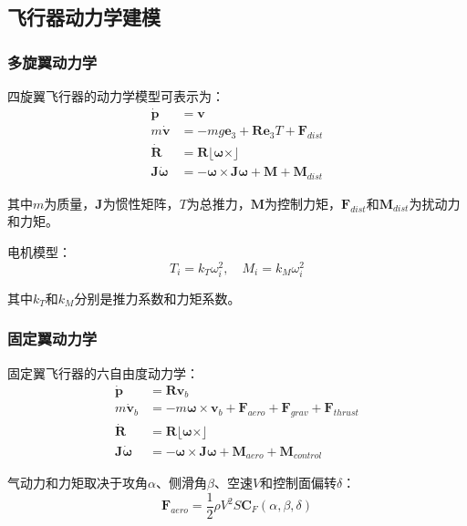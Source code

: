 \documentclass[12pt,a4paper]{ctexart}
\begin{document}
\subsection{飞行器动力学建模}

\subsubsection{多旋翼动力学}

四旋翼飞行器的动力学模型可表示为：
\begin{align}
    \dot{\mathbf{p}} &= \mathbf{v} \\
    m\dot{\mathbf{v}} &= -mg\mathbf{e}_3 + \mathbf{R}\mathbf{e}_3 T + \mathbf{F}_{dist} \\
    \dot{\mathbf{R}} &= \mathbf{R}\lfloor\boldsymbol{\omega}\times\rfloor \\
    \mathbf{J}\dot{\boldsymbol{\omega}} &= -\boldsymbol{\omega} \times \mathbf{J}\boldsymbol{\omega} + \mathbf{M} + \mathbf{M}_{dist}
\end{align}

其中$m$为质量，$\mathbf{J}$为惯性矩阵，$T$为总推力，$\mathbf{M}$为控制力矩，$\mathbf{F}_{dist}$和$\mathbf{M}_{dist}$为扰动力和力矩。

电机模型：
\begin{equation}
    T_i = k_T \omega_i^2, \quad M_i = k_M \omega_i^2
\end{equation}

其中$k_T$和$k_M$分别是推力系数和力矩系数。

\subsubsection{固定翼动力学}

固定翼飞行器的六自由度动力学：
\begin{align}
    \dot{\mathbf{p}} &= \mathbf{R}\mathbf{v}_b \\
    m\dot{\mathbf{v}}_b &= -m\boldsymbol{\omega} \times \mathbf{v}_b + \mathbf{F}_{aero} + \mathbf{F}_{grav} + \mathbf{F}_{thrust} \\
    \dot{\mathbf{R}} &= \mathbf{R}\lfloor\boldsymbol{\omega}\times\rfloor \\
    \mathbf{J}\dot{\boldsymbol{\omega}} &= -\boldsymbol{\omega} \times \mathbf{J}\boldsymbol{\omega} + \mathbf{M}_{aero} + \mathbf{M}_{control}
\end{align}

气动力和力矩取决于攻角$\alpha$、侧滑角$\beta$、空速$V$和控制面偏转$\delta$：
\begin{equation}
    \mathbf{F}_{aero} = \frac{1}{2}\rho V^2 S \mathbf{C}_F(\alpha, \beta, \delta)
\end{equation}
\end{document}
